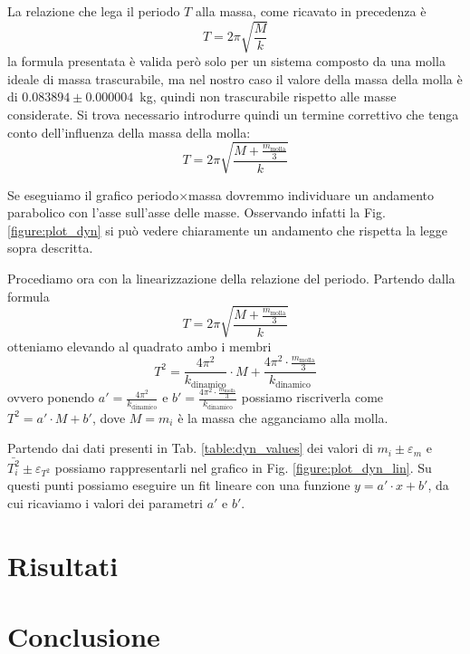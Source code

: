 \documentclass[italian, a4paper, 10pt, twocolumn]{../../style/lab_unige}
\newcommand{\reftab}[1]{Tab. {\ref{#1}}}%
\newcommand{\reffig}[1]{Fig. {\ref{#1}}}%
\begin{document}
{    La relazione che lega il periodo $T$ alla massa, come ricavato in precedenza è
    \[
        T = 2 \pi \sqrt{\frac{M}{k}}
    \]
    la formula presentata è valida però solo per un sistema composto da una molla ideale di massa trascurabile, 
    ma nel nostro caso il valore della massa della molla è di $0.083894\pm0.000004$~kg, quindi non trascurabile 
    rispetto alle masse considerate.
    Si trova necessario introdurre quindi un termine correttivo che tenga conto dell'influenza della massa della
    molla:
    \[
        T = 2 \pi \sqrt{\frac{M+\frac{m_{\text{molla}}}{3}}{k}}
    \]
    
    Se eseguiamo il grafico periodo$\times$massa dovremmo individuare un andamento parabolico con l'asse sull'asse 
    delle masse. Osservando infatti la \reffig{figure:plot_dyn} si può vedere chiaramente un andamento che rispetta
    la legge sopra descritta.

    Procediamo ora con la linearizzazione della relazione del periodo. Partendo dalla formula
    \[
        T = 2 \pi \sqrt{\frac{M+\frac{m_{\text{molla}}}{3}}{k}}
    \]
    otteniamo elevando al quadrato ambo i membri
    \[
        T^2 = \frac{4 \pi^2}{k_{\text{dinamico}}} \cdot M + \frac{4 \pi^2 \cdot \frac{m_{\text{molla}}}{3}}{k_{\text{dinamico}}}
    \]
    ovvero ponendo $a'=\frac{4 \pi^2}{k_{\text{dinamico}}}$ e 
    $b'=\frac{4 \pi^2 \cdot \frac{m_{\text{molla}}}{3}}{k_{\text{dinamico}}}$ possiamo riscriverla come 
    $T^2 = a'\cdot M + b'$, 
    dove $M=m_i$ è la massa che agganciamo alla molla.

    Partendo dai dati presenti in \reftab{table:dyn_values} dei valori di $m_i\pm\varepsilon_m$ e 
    $\bar{T_i^2}\pm\varepsilon_{T^2}$ possiamo rappresentarli nel grafico in \reffig{figure:plot_dyn_lin}.
    Su questi punti possiamo eseguire un fit lineare con una funzione $y = a'\cdot x + b'$, da cui ricaviamo i 
    valori dei parametri $a'$ e $b'$.


    

    \section{Risultati}
    \label{section:results}

    


    \section{Conclusione}
    \label{section:conclusion}

}
\end{document}
